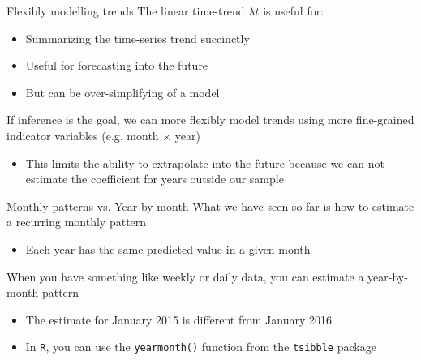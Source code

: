 \documentclass[aspectratio=169,t,11pt,table]{beamer}
\begin{document}
\begin{frame}{Flexibly modelling trends}
  The linear time-trend $\lambda t$ is useful for:
  \begin{itemize}
    \item Summarizing the time-series trend succinctly
    
    \item Useful for forecasting into the future

    \item But can be over-simplifying of a model
  \end{itemize}

  \bigskip
  If inference is the goal, we can more flexibly model trends using more fine-grained indicator variables (e.g. month $\times$ year)
  \begin{itemize}
    \item This limits the ability to extrapolate into the future because we can not estimate the coefficient for years outside our sample
  \end{itemize}
\end{frame}

\begin{frame}{Monthly patterns vs. Year-by-month}
  What we have seen so far is how to estimate a recurring monthly pattern
  \begin{itemize}
    \item Each year has the same predicted value in a given month
  \end{itemize}

  \pause
  \bigskip
  When you have something like weekly or daily data, you can estimate a year-by-month pattern
  \begin{itemize}
    \item The estimate for January 2015 is different from January 2016
    \item In \texttt{R}, you can use the \texttt{yearmonth()} function from the \texttt{tsibble} package
  \end{itemize}
\end{frame}

\end{document}
